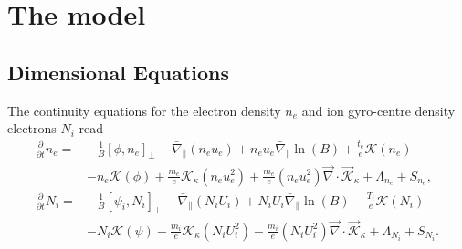 \section{The model}
\subsection{Dimensional Equations}
The continuity equations for the electron density \(n_e\) and  ion gyro-centre density electrons  \(N_i\) read
\begin{align}
 \frac{\partial}{\partial t}n_e =&
 - \frac{1}{B}\left[\phi,  n_e \right]_{\perp}
 -  \bar{\nabla}_{\parallel}( n_e u_e)
 + n_e u_e   \bar{\nabla}_{\parallel} \ln{(B)}
+ \frac{t_e }{e }  \mathcal{K} \left( n_e\right)
\nonumber  \\ &
-   n_e \mathcal{K}(\phi)
   +  \frac{m_e }{ e } \mathcal{K}_{\kappa} \left( n_e u_e^2 \right)
   + \frac{m_e }{ e } \left( n_e u_e^2 \right) \vec{\nabla} \cdot  \vec{\mathcal{K}}_{\kappa}
   + \Lambda_{n_e} + S_{n_e},\\
\frac{\partial}{\partial t}N_i =&
 - \frac{1}{B}\left[\psi_i,  N_i \right]_{\perp}
 - \bar{\nabla}_{\parallel}(N_i U_i)
 + N_i U_i   \bar {\nabla}_{\parallel} \ln{(B)}
- \frac{T_i }{e }  \mathcal{K} \left( N_i\right)
\nonumber  \\ &
-   N_i \mathcal{K}(\psi)
- \frac{m_i }{ e }\mathcal{K}_{\kappa}  \left( N_i U_i^2 \right)
- \frac{m_i }{ e } \left( N_i U_i^2 \right)\vec{\nabla} \cdot  \vec{\mathcal{K}}_{\kappa}
+ \Lambda_{N_i} + S_{N_i}.
\end{align}
